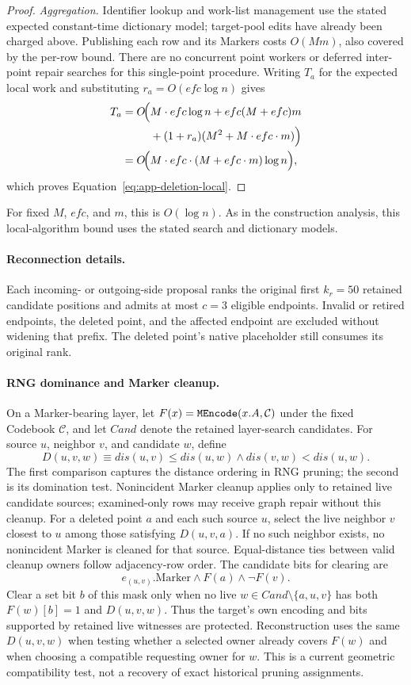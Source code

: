 \begin{proof}
\emph{Aggregation.}
Identifier lookup and work-list management use the stated expected constant-time dictionary model; target-pool edits have already been charged above.
Publishing each row and its Markers costs $O(Mm)$, also covered by the per-row bound.
There are no concurrent point workers or deferred inter-point repair searches for this single-point procedure.
Writing $T_a$ for the expected local work and substituting $r_a=O(efc\log n)$ gives
\[
\begin{aligned}
T_a = O\!\Bigl(&M\cdot efc\log n + efc(M+efc)m\\
              &+(1+r_a)(M^2+M\cdot efc\cdot m)\Bigr)\\
    = O\!\Bigl(&M\cdot efc\cdot(M+efc\cdot m)\log n\Bigr),
\end{aligned}
\]
which proves Equation~\eqref{eq:app-deletion-local}.
\end{proof}

For fixed $M$, $efc$, and $m$, this is $O(\log n)$.
As in the construction analysis, this local-algorithm bound uses the stated search and dictionary models.

\paragraph{Reconnection details.}
Each incoming- or outgoing-side proposal ranks the original first $k_r=50$
retained candidate positions and admits at most $c=3$ eligible endpoints.
Invalid or retired endpoints, the deleted point, and the affected endpoint are
excluded without widening that prefix.
The deleted point's native placeholder still consumes its original rank.

\paragraph{RNG dominance and Marker cleanup.}
On a Marker-bearing layer, let $F(x)={\tt MEncode}(x.A,\mathcal C)$
under the fixed Codebook $\mathcal C$, and let $Cand$ denote the
retained layer-search candidates.
For source $u$, neighbor $v$, and candidate $w$, define
\[
  D(u,v,w)\equiv
  dis(u,v)\le dis(u,w)\land dis(v,w)<dis(u,w).
\]
The first comparison captures the distance ordering in RNG pruning;
the second is its domination test.
Nonincident Marker cleanup applies only to retained live candidate sources;
examined-only rows may receive graph repair without this cleanup.
For a deleted point $a$ and each such source $u$, select the live neighbor
$v$ closest to $u$ among those satisfying $D(u,v,a)$.
If no such neighbor exists, no nonincident Marker is cleaned for that source.
Equal-distance ties between valid cleanup owners follow adjacency-row order.
The candidate bits for clearing are
\[
  e_{(u,v)}.\mathrm{Marker}\land F(a)\land\neg F(v).
\]
Clear a set bit $b$ of this mask only when no live
$w\in Cand\setminus\{a,u,v\}$ has both $F(w)[b]=1$ and $D(u,v,w)$.
Thus the target's own encoding and bits supported by retained live witnesses
are protected.
Reconstruction uses the same $D(u,v,w)$ when testing whether a selected owner
already covers $F(w)$ and when choosing a compatible requesting owner for $w$.
This is a current geometric compatibility test, not a recovery of exact
historical pruning assignments.

